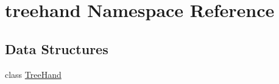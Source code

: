 \hypertarget{namespacetreehand}{}\section{treehand Namespace Reference}
\label{namespacetreehand}
\subsection*{Data Structures}
\begin{DoxyCompactItemize}
\item 
class \hyperlink{classtreehand_1_1_tree_hand}{Tree\+Hand}
\end{DoxyCompactItemize}
